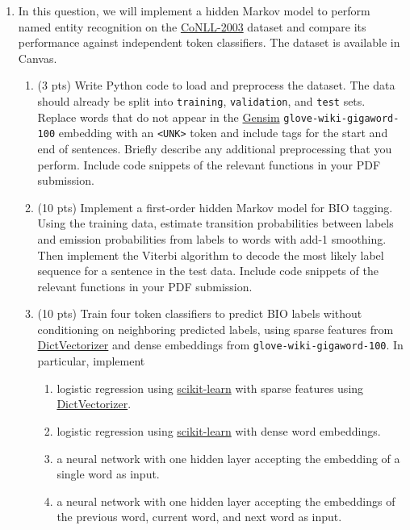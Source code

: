 \documentclass{article}
\begin{document}
\begin{enumerate}
    \item In this question, we will implement a hidden Markov model to perform named entity recognition on the \href{https://huggingface.co/datasets/eriktks/conll2003}{CoNLL-2003} dataset and compare its performance against independent token classifiers. The dataset is available in Canvas.
    \begin{enumerate}
        \item (3 pts) Write Python code to load and preprocess the dataset. The data should already be split into \verb|training|, \verb|validation|, and \verb|test| sets. Replace words that do not appear in the \href{https://radimrehurek.com/gensim/}{Gensim} \texttt{glove-wiki-gigaword-100} embedding with an \verb|<UNK>| token and include tags for the start and end of sentences. Briefly describe any additional preprocessing that you perform. Include code snippets of the relevant functions in your PDF submission.

        \item (10 pts) Implement a first-order hidden Markov model for BIO tagging. Using the training data, estimate transition probabilities between labels and emission probabilities from labels to words with add-1 smoothing. Then implement the Viterbi algorithm to decode the most likely label sequence for a sentence in the test data. Include code snippets of the relevant functions in your PDF submission.

        \item (10 pts) Train four token classifiers to predict BIO labels without conditioning on neighboring predicted labels, using sparse features from \href{https://scikit-learn.org/stable/modules/generated/sklearn.feature_extraction.DictVectorizer.html}{DictVectorizer} and dense embeddings from \texttt{glove-wiki-gigaword-100}. In particular, implement
        \begin{enumerate}
            \item logistic regression using \href{https://scikit-learn.org/stable/modules/generated/sklearn.linear_model.LogisticRegression.html}{scikit-learn} with sparse features using \href{https://scikit-learn.org/stable/modules/generated/sklearn.feature_extraction.DictVectorizer.html}{DictVectorizer}.
            \item logistic regression using \href{https://scikit-learn.org/stable/modules/generated/sklearn.linear_model.LogisticRegression.html}{scikit-learn} with dense word embeddings.
            \item a neural network with one hidden layer accepting the embedding of a single word as input.
            \item a neural network with one hidden layer accepting the embeddings of the previous word, current word, and next word as input.
        \end{enumerate}


\end{enumerate}
\end{enumerate}
\end{document}
